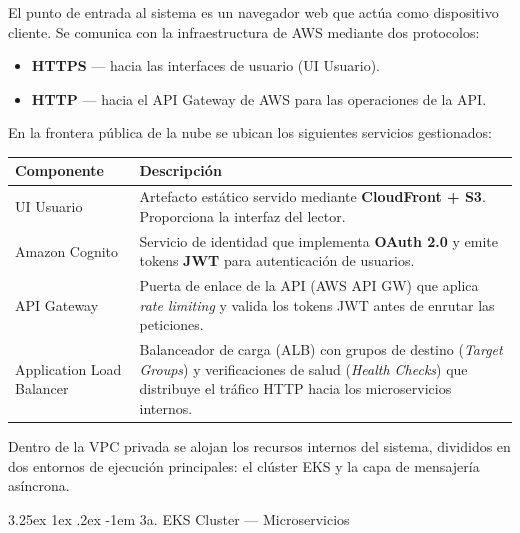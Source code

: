 \documentclass[a4paper,11 pt]{article}
\makeatletter
\newcounter{subsubsubsection}[subsubsection]
\renewcommand\paragraph{\@startsection{paragraph}{5}{\z@}%
  {3.25ex \@plus1ex \@minus.2ex}%
  {-1em}%
  {\normalfont\normalsize\bfseries}}
\makeatother
\begin{document}

El punto de entrada al sistema es un navegador web que actúa como dispositivo cliente. Se comunica con la infraestructura de AWS mediante dos protocolos:

\begin{itemize}
    \item \textbf{HTTPS} — hacia las interfaces de usuario (UI Usuario).
    \item \textbf{HTTP} — hacia el API Gateway de AWS para las operaciones de la API.
\end{itemize}


En la frontera pública de la nube se ubican los siguientes servicios gestionados:

\begin{table}[H]
\centering
\footnotesize
\begin{tabular}{|M{0.2\textwidth}|M{0.7\textwidth}|}
 \hline
    \textbf{Componente} & \textbf{Descripción} \\
    \hline
    UI Usuario & Artefacto estático servido mediante \textbf{CloudFront + S3}. Proporciona la interfaz del lector. \\
     \hline
     Amazon Cognito & Servicio de identidad que implementa \textbf{OAuth 2.0} y emite tokens \textbf{JWT} para autenticación de usuarios. \\
     \hline
     API Gateway & Puerta de enlace de la API (AWS API GW) que aplica \textit{rate limiting} y valida los tokens JWT antes de enrutar las peticiones. \\
     \hline
     Application Load Balancer & Balanceador de carga (ALB) con grupos de destino (\textit{Target Groups}) y verificaciones de salud (\textit{Health Checks}) que distribuye el tráfico HTTP hacia los microservicios internos. \\
     \hline
\end{tabular}
\end{table}


Dentro de la VPC privada se alojan los recursos internos del sistema, divididos en dos entornos de ejecución principales: el clúster EKS y la capa de mensajería asíncrona.

\paragraph{3a. EKS Cluster — Microservicios}\mbox{}\\
\end{document}
